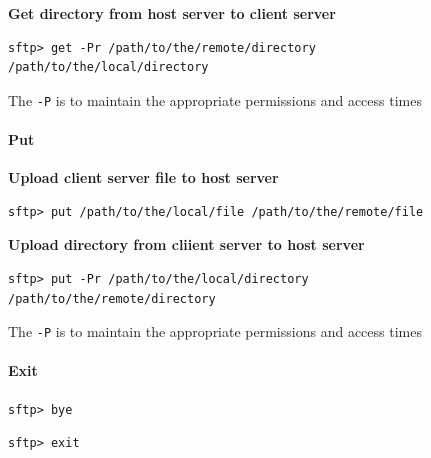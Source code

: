 \documentclass{article}
\newenvironment{blocktemplateI}[1]{%
    \tcolorbox[beamer,%
    noparskip,breakable,
    colframe=Violet,%
    colbacklower=Black,%
    title=#1]}%
    {\endtcolorbox}
\newenvironment{codetemplate}[1][]{%
  \mybasecolorbox[#1]
  \itshape
}{%
  \endmybasecolorbox
}
\begin{document}
\textbf{Get directory from host server to client server}
\begin{codetemplate}{}
\begin{verbatim}
sftp> get -Pr /path/to/the/remote/directory /path/to/the/local/directory
\end{verbatim}
\end{codetemplate}

\begin{blocktemplateI}{NOTE}
The \verb|-P| is to maintain the appropriate permissions and access times
\end{blocktemplateI}

\paragraph{Put}

\textbf{Upload client server file to host server}
\begin{codetemplate}{}
\begin{verbatim}
sftp> put /path/to/the/local/file /path/to/the/remote/file
\end{verbatim}
\end{codetemplate}

\textbf{Upload directory from cliient server to host server}
\begin{codetemplate}{}
\begin{verbatim}
sftp> put -Pr /path/to/the/local/directory /path/to/the/remote/directory
\end{verbatim}
\end{codetemplate}

\begin{blocktemplateI}{NOTE}
The \verb|-P| is to maintain the appropriate permissions and access times
\end{blocktemplateI}

\paragraph{Exit}
\begin{codetemplate}{}
\begin{verbatim}
sftp> bye
\end{verbatim}
\end{codetemplate}

\begin{codetemplate}{}
\begin{verbatim}
sftp> exit
\end{verbatim}
\end{codetemplate}
\end{document}
